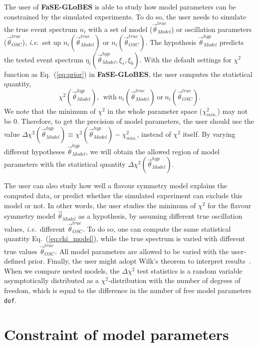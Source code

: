 \documentclass[aps,prd,nofootinbib,preprint]{revtex4}
\begin{document}
The user of \textbf{FaSE-GLoBES} is able to study how model parameters can be constrained by the simulated experiments. To do so, the user needs to simulate the true event spectrum $n_i$ with a set of model ($\vec{\theta}_{Model}^{true}$) or oscillation parameters ($\vec{\theta}_{OSC}^{true}$), \textit{i.e.}~set up $n_i(\vec{\theta}_{Model}^{true})$ or $n_i(\vec{\theta}_{OSC}^{true})$. The hypothesis $\vec{\theta}_{Model}^{hyp}$ predicts the tested event spectrum $\eta_i(\vec{\theta}_{Model}^{hyp},\xi_s,\xi_b)$. With the default settings for $\chi^2$ function as Eq.~(\ref{eq:prior}) in \textbf{FaSE-GLoBES}, the user computes the statistical quantity,
\begin{equation}\label{eq:chi_model}
\chi^2(\vec{\theta}_{Model}^{hyp}),~~\text{with}~n_i(\vec{\theta}_{Model}^{true})~\text{or}~n_i(\vec{\theta}_{OSC}^{true}).
\end{equation}
%
We note that the minimum of $\chi^2$ in the whole parameter space ($\chi^2_{min.}$) may not be $0$. Therefore, to get the precision of model parameters, the user should use the value $\Delta\chi^2(\vec{\theta}_{Model}^{hyp})\equiv \chi^2(\vec{\theta}_{Model}^{hyp})-\chi^2_{min.}$, instead of $\chi^2$ itself. By varying different hypotheses $\vec{\theta}_{Model}^{hyp}$, we will obtain the allowed region of model parameters with the statistical quantity $\Delta\chi^2(\vec{\theta}_{Model}^{hyp})$. 

The user can also study how well a flavour symmetry model explains the computed data, or predict whether the simulated experiment can exclude this model or not. In other words, the user studies the minimum of $\chi^2$ for the flavour symmetry model $\vec{\theta}_{Model}$ as a hypothesis, by assuming different true oscillation values, \textit{i.e.}~different $\vec{\theta}^{true}_{OSC}$. To do so, one can compute the same statistical quantity Eq.~(\ref{eq:chi_model}), while the true spectrum is varied with different true values $\vec{\theta}_{OSC}^{true}$. All model parameters are allowed to be varied with the user-defined prior.
%
Finally, the user might adopt Wilk's theorem to interpret results~\cite{Wilks:1938dza}. When we compare nested models, the $\Delta \chi^2$ test statistics is a random variable asymptotically distributed as a $\chi^2$-distribution with the number of degrees of freedom, which is equal to the difference in the number of free model parameters \texttt{dof}. 

\section{Constraint of model parameters}
\end{document}
